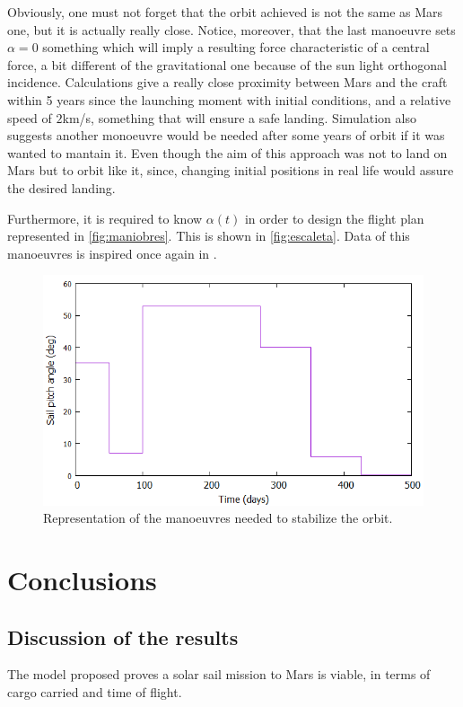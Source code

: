 \documentclass[twocolumn,12pt,a4paper]{article}
\numberwithin{equation}{section}
\begin{document}
Obviously, one must not forget that the orbit achieved is not the same as Mars one, but it is actually really close. Notice, moreover, that the last manoeuvre sets $\alpha=0$ something which will imply a resulting force characteristic of a central force, a bit different of the gravitational one because of the sun light orthogonal incidence. Calculations give a really close proximity between Mars and the craft within 5 years since the launching moment with initial conditions, and a relative speed of $2$km/s, something that will ensure a safe landing. Simulation also suggests another monoeuvre would be needed after some years of orbit if it was wanted to mantain it. Even though the aim of this approach was not to land on Mars but to orbit like it, since, changing initial positions in real life would assure the desired landing.

Furthermore, it is required to know $\alpha(t)$ in order to design the flight plan represented in \autoref{fig:maniobres}. This is shown in \autoref{fig:escaleta}. Data of this manoeuvres is inspired once again in \cite{xinos}.


\begin{figure}
	\label{fig:escaleta}
	\includegraphics[scale=0.35]{cocu.png}
	\caption{Representation of the manoeuvres needed to stabilize the orbit.}
\end{figure}
\section{Conclusions}
\subsection{Discussion of the results}
The model proposed proves a solar sail mission to Mars is viable, in terms of cargo carried and time of flight.
\end{document}

